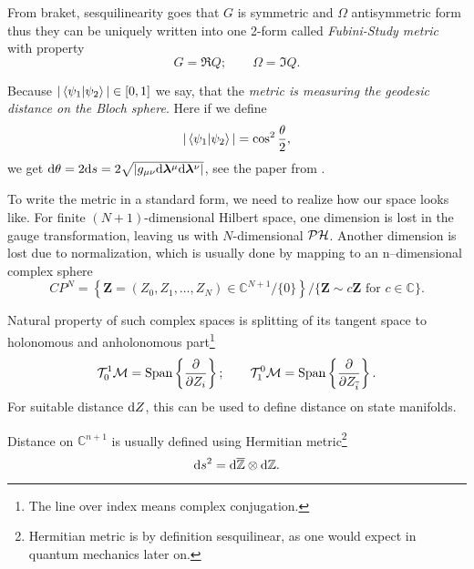 From braket, sesquilinearity goes that $G$ is symmetric and $\Omega$ antisymmetric form thus they can be uniquely written into one 2-form called \emph{Fubini-Study metric} with property
\begin{equation}
    G=\Re Q ;\qquad \Omega=\Im Q.
\end{equation}

Because $|\braket{\psi_1|\psi_2}|\in[0,1]$ we say, that the \emph{metric is measuring the geodesic distance on the Bloch sphere}. Here if we define
\begin{equation}
    |\braket{\psi_1|\psi_2}|=\cos^2 \frac{\theta}{2},
\end{equation}
we get $\mathrm{d} \theta= 2\mathrm{d} s=2\sqrt{|g_{\mu\nu}\mathrm{d} {\bm\lambda}^\mu\mathrm{d} {\bm\lambda}^\nu|}$, see the paper from \citet{cheng_quantum_2013}.

To write the metric in a standard form, we need to realize how our space looks like. For finite $(N+1)$-dimensional Hilbert space, one dimension is lost in the gauge transformation, leaving us with $N$-dimensional $\mathcal{PH}$. Another dimension is lost due to normalization, which is usually done by mapping to an n--dimensional complex sphere
$$CP^N= \left\{ \bm Z=(Z_0,Z_1,\dots,Z_N)\in \mathbb{C}^{N+1}/\{0\} \right\}\Big/ \{\bm Z\sim c\bm Z \text{ for } c\in \mathbb{C}\}.$$

Natural property of such complex spaces is splitting of its tangent space to holonomous and anholonomous part\footnote{The line over index means complex conjugation.}
$$\mathcal T^1_0\mathcal{M}=\text{Span}\left\{\frac{\partial}{\partial Z_i}\right\}; \qquad \mathcal T^0_1\mathcal{M}=\text{Span}\left\{\frac{\partial}{\partial Z_{\overline{i}}}\right\}.$$
For suitable distance $\mathrm{d} Z$, this can be used to define distance on state manifolds.


Distance on $\mathbb{C}^{n+1}$ is usually defined using Hermitian metric\footnote{Hermitian metric is by definition sesquilinear, as one would expect in quantum mechanics later on.} 
\begin{equation}
    \mathrm{d} s^2 = \mathrm{d} \overline{\mathbb{Z}} \otimes \mathrm{d} \mathbb{Z}.
\label{eq:metricdistancePH}
\end{equation}




